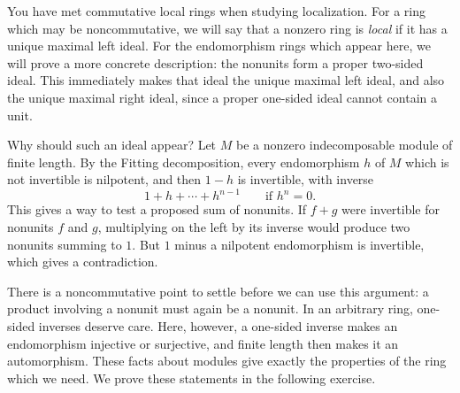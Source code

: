\documentclass[12pt,reqno]{amsart}
\begin{document}
\hrulefill

You have met commutative local rings when studying localization. For a ring which may be noncommutative, we will say that a nonzero ring is \emph{local} if it has a unique maximal left ideal. For the endomorphism rings which appear here, we will prove a more concrete description: the nonunits form a proper two-sided ideal. This immediately makes that ideal the unique maximal left ideal, and also the unique maximal right ideal, since a proper one-sided ideal cannot contain a unit.

Why should such an ideal appear? Let $M$ be a nonzero indecomposable module of finite length. By the Fitting decomposition, every endomorphism $h$ of $M$ which is not invertible is nilpotent, and then $1-h$ is invertible, with inverse
\[
1+h+\cdots+h^{n-1}\qquad\text{if }h^n=0.
\]
This gives a way to test a proposed sum of nonunits. If $f+g$ were invertible for nonunits $f$ and $g$, multiplying on the left by its inverse would produce two nonunits summing to $1$. But $1$ minus a nilpotent endomorphism is invertible, which gives a contradiction.

There is a noncommutative point to settle before we can use this argument: a product involving a nonunit must again be a nonunit. In an arbitrary ring, one-sided inverses deserve care. Here, however, a one-sided inverse makes an endomorphism injective or surjective, and finite length then makes it an automorphism. These facts about modules give exactly the properties of the ring which we need. We prove these statements in the following exercise.

\hrulefill
\end{document}
